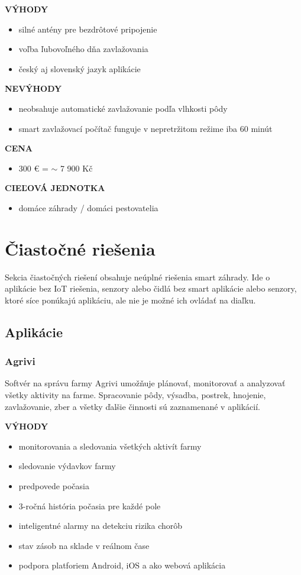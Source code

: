 \documentclass[twoside]{ctuthesis}
\theoremstyle{plain}
\theoremstyle{definition}
\theoremstyle{note}
\begin{document}
\textbf{VÝHODY}
\begin{itemize}
\item silné antény pre bezdrôtové pripojenie
\item voľba ľubovoľného dňa zavlažovania
\item český aj slovenský jazyk aplikácie
\end{itemize}

\textbf{NEVÝHODY}
\begin{itemize}
\item neobsahuje automatické zavlažovanie podľa vlhkosti pôdy
\item smart zavlažovací počítač funguje v nepretržitom režime iba 60 minút
\end{itemize}

\textbf{CENA}
\begin{itemize}
\item 300 €  =  $\sim$ 7 900 Kč 
\end{itemize}

\textbf{CIEĽOVÁ JEDNOTKA}
\begin{itemize}
\item domáce záhrady / domáci pestovatelia
\end{itemize}
 
 
\section{Čiastočné riešenia}
Sekcia čiastočných riešení obsahuje neúplné riešenia smart záhrady. Ide o aplikácie bez IoT riešenia, senzory alebo čidlá bez smart aplikácie alebo senzory, ktoré síce ponúkajú aplikáciu, ale nie je možné ich ovládať na diaľku.

\subsection{Aplikácie}
\subsubsection*{Agrivi}
Softvér na správu farmy Agrivi umožňuje plánovať, monitorovať a analyzovať všetky aktivity na farme. Spracovanie pôdy, výsadba, postrek, hnojenie, zavlažovanie, zber a všetky ďalšie činnosti sú zaznamenané v aplikácií. \cite{agrivi}
\newline

\textbf{VÝHODY}
\begin{itemize}
\item monitorovania a sledovania všetkých aktivít farmy
\item sledovanie výdavkov farmy
\item predpovede počasia
\item 3-ročná história počasia pre každé pole
\item inteligentné alarmy na detekciu rizika chorôb
\item stav zásob na sklade v reálnom čase 
\item podpora platforiem Android, iOS a ako webová aplikácia
\end{itemize}
\end{document}
